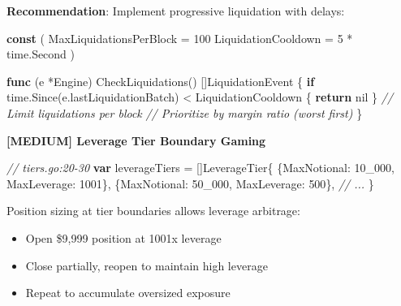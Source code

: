 \documentclass[
]{article}
\newenvironment{Shaded}{}{}
\newcommand{\CommentTok}[1]{\textcolor[rgb]{0.38,0.63,0.69}{\textit{#1}}}
\newcommand{\ControlFlowTok}[1]{\textcolor[rgb]{0.00,0.44,0.13}{\textbf{#1}}}
\newcommand{\DecValTok}[1]{\textcolor[rgb]{0.25,0.63,0.44}{#1}}
\newcommand{\KeywordTok}[1]{\textcolor[rgb]{0.00,0.44,0.13}{\textbf{#1}}}
\newcommand{\NormalTok}[1]{#1}
\newcommand{\OperatorTok}[1]{\textcolor[rgb]{0.40,0.40,0.40}{#1}}
\newcommand{\OtherTok}[1]{\textcolor[rgb]{0.00,0.44,0.13}{#1}}
\providecommand{\tightlist}{%
  \setlength{\itemsep}{0pt}\setlength{\parskip}{0pt}}
\begin{document}
\textbf{Recommendation}: Implement progressive liquidation with delays:

\begin{Shaded}
\begin{Highlighting}[]
\KeywordTok{const} \OperatorTok{(}
\NormalTok{    MaxLiquidationsPerBlock }\OperatorTok{=} \DecValTok{100}
\NormalTok{    LiquidationCooldown     }\OperatorTok{=} \DecValTok{5} \OperatorTok{*}\NormalTok{ time}\OperatorTok{.}\NormalTok{Second}
\OperatorTok{)}

\KeywordTok{func} \OperatorTok{(}\NormalTok{e }\OperatorTok{*}\NormalTok{Engine}\OperatorTok{)}\NormalTok{ CheckLiquidations}\OperatorTok{()} \OperatorTok{[]}\NormalTok{LiquidationEvent }\OperatorTok{\{}
    \ControlFlowTok{if}\NormalTok{ time}\OperatorTok{.}\NormalTok{Since}\OperatorTok{(}\NormalTok{e}\OperatorTok{.}\NormalTok{lastLiquidationBatch}\OperatorTok{)} \OperatorTok{\textless{}}\NormalTok{ LiquidationCooldown }\OperatorTok{\{}
        \ControlFlowTok{return} \OtherTok{nil}
    \OperatorTok{\}}
    \CommentTok{// Limit liquidations per block}
    \CommentTok{// Prioritize by margin ratio (worst first)}
\OperatorTok{\}}
\end{Highlighting}
\end{Shaded}

\textbf{{[}MEDIUM{]} Leverage Tier Boundary Gaming}

\begin{Shaded}
\begin{Highlighting}[]
\CommentTok{// tiers.go:20{-}30}
\KeywordTok{var}\NormalTok{ leverageTiers }\OperatorTok{=} \OperatorTok{[]}\NormalTok{LeverageTier}\OperatorTok{\{}
    \OperatorTok{\{}\NormalTok{MaxNotional}\OperatorTok{:} \DecValTok{10\_000}\OperatorTok{,}\NormalTok{ MaxLeverage}\OperatorTok{:} \DecValTok{1001}\OperatorTok{\},}
    \OperatorTok{\{}\NormalTok{MaxNotional}\OperatorTok{:} \DecValTok{50\_000}\OperatorTok{,}\NormalTok{ MaxLeverage}\OperatorTok{:} \DecValTok{500}\OperatorTok{\},}
    \CommentTok{// ...}
\OperatorTok{\}}
\end{Highlighting}
\end{Shaded}

Position sizing at tier boundaries allows leverage arbitrage:

\begin{itemize}
\tightlist
\item
  Open \$9,999 position at 1001x leverage
\item
  Close partially, reopen to maintain high leverage
\item
  Repeat to accumulate oversized exposure
\end{itemize}
\end{document}
